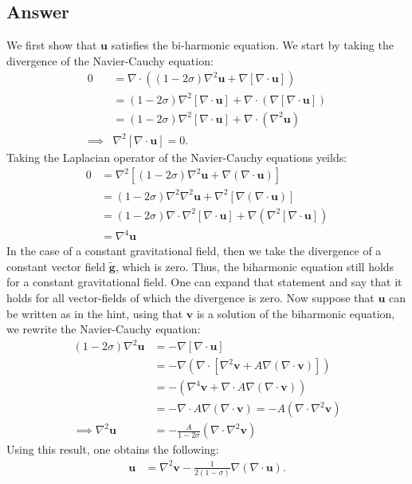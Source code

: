 \documentclass{article}
\newcommand{\laplace}{\nabla^2}
\begin{document}
\subsection*{Answer}
We first show that $\mathbf{u}$ satisfies the bi-harmonic equation. We start by taking the divergence of the Navier-Cauchy equation:
\begin{align*}
    0 &= \nabla\cdot\left((1-2\sigma)\laplace\mathbf{u} + \nabla\left[\nabla\cdot \mathbf{u}\right]\right)\\
    &= (1-2\sigma)\laplace\left[\nabla\cdot\mathbf{u}\right] + \nabla\cdot\left(\nabla\left[\nabla\cdot \mathbf{u}\right]\right)\\
    &= (1-2\sigma)\laplace\left[\nabla\cdot\mathbf{u}\right] + \nabla\cdot\left(\laplace\mathbf{u}\right)\\
    \implies& \laplace\left[\nabla\cdot\mathbf{u}\right] = 0.
\end{align*}Taking the Laplacian operator of the Navier-Cauchy equations yeilds:
\begin{align*}
    0 &= \laplace\left[(1-2\sigma)\laplace\mathbf{u} + \nabla\left(\nabla\cdot \mathbf{u}\right)\right]\\
    &= (1-2\sigma)\laplace\laplace\mathbf{u} + \laplace\left[\nabla\left(\nabla\cdot \mathbf{u}\right)\right]\\
    &= (1-2\sigma)\nabla\cdot\laplace\left[\nabla\cdot\mathbf{u}\right] + \nabla\left(\laplace\left[\nabla\cdot \mathbf{u}\right]\right)\\
    &= \nabla^4\mathbf{u}
\end{align*} In the case of a constant gravitational field, then we take the divergence of a constant vector field $\tilde{\mathbf{g}}$, which is zero. Thus, the biharmonic equation still holds for a constant gravitational field.
One can expand that statement and say that it holds for all vector-fields of which the divergence is zero.
Now suppose that $\mathbf{u}$ can be written as in the hint, using that $\mathbf{v}$ is a solution of the biharmonic equation, we rewrite the Navier-Cauchy equation:
\begin{align*}
    (1-2\sigma)\laplace{\mathbf{u}} &=- \nabla\left[\nabla\cdot\mathbf{u}\right]\\
    &= -\nabla\left(\nabla\cdot\left[\laplace{\mathbf{v}} + A\nabla\left(\nabla\cdot\mathbf{v}\right)\right]\right)\\
    &= -\left(\nabla^4\mathbf{v} + \nabla\cdot A\nabla(\nabla\cdot\mathbf{v})\right)\\
    &= -\nabla\cdot A\nabla(\nabla\cdot\mathbf{v}) = -A\left(\nabla\cdot\laplace\mathbf{v}\right)\\
    \implies \laplace{\mathbf{u}} &= -\frac{A}{1-2\sigma}\left(\nabla\cdot\laplace\mathbf{v}\right)
\end{align*}Using this result, one obtains the following:
\begin{align*}
    \mathbf{u} &= \laplace\mathbf{v} - \frac{1}{2(1-\sigma)}\nabla\left(\nabla\cdot\mathbf{u}\right).
\end{align*}
\end{document}
